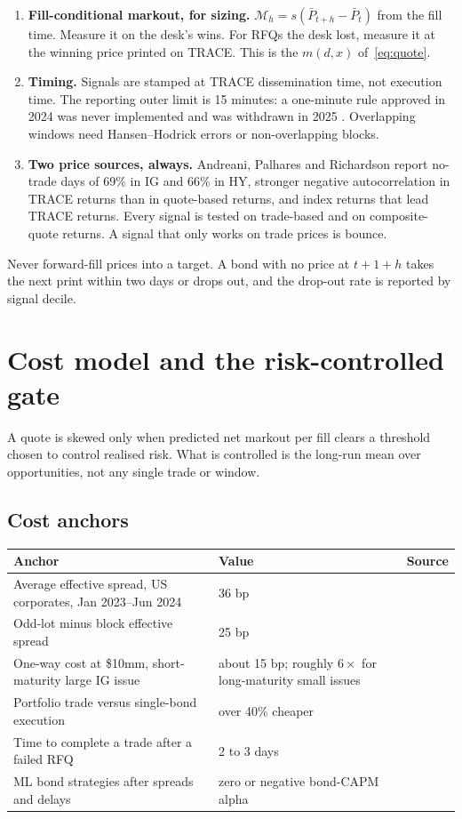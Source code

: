 \documentclass[11pt,letterpaper]{article}
\newcommand{\Pm}{\bar{P}}                 %
\begin{document}
\begin{enumerate}[itemsep=4pt]
\item \textbf{Fill-conditional markout, for sizing.} $\mathcal{M}_h=s(\Pm_{t+h}-\Pm_t)$ from the fill time. Measure it on the desk's wins. For RFQs the desk lost, measure it at the winning price printed on TRACE. This is the $m(d,x)$ of~\eqref{eq:quote}.

\item \textbf{Timing.} Signals are stamped at TRACE dissemination time, not execution time. The reporting outer limit is 15 minutes: a one-minute rule approved in 2024 was never implemented and was withdrawn in 2025 \cite{sec2025}. Overlapping windows need Hansen--Hodrick errors or non-overlapping blocks.

\item \textbf{Two price sources, always.} Andreani, Palhares and Richardson \cite{andreani2024} report no-trade days of 69\% in IG and 66\% in HY, stronger negative autocorrelation in TRACE returns than in quote-based returns, and index returns that lead TRACE returns. Every signal is tested on trade-based and on composite-quote returns. A signal that only works on trade prices is bounce.
\end{enumerate}

Never forward-fill prices into a target. A bond with no price at $t+1+h$ takes the next print within two days or drops out, and the drop-out rate is reported by signal decile.

\section{Cost model and the risk-controlled gate}
\label{sec:cost}

A quote is skewed only when predicted net markout per fill clears a threshold chosen to control realised risk. What is controlled is the long-run mean over opportunities, not any single trade or window.

\subsection{Cost anchors}
\begin{center}
\begin{tabularx}{\textwidth}{@{}X l l@{}}
\toprule
Anchor & Value & Source \\
\midrule
Average effective spread, US corporates, Jan 2023--Jun 2024 & 36 bp & \cite{msrb2025} \\
Odd-lot minus block effective spread & 25 bp & \cite{msrb2025} \\
One-way cost at \$10mm, short-maturity large IG issue & about 15 bp; roughly $6\times$ for long-maturity small issues & \cite{ivakos2024} \\
Portfolio trade versus single-bond execution & over 40\% cheaper & \cite{mt2023} \\
Time to complete a trade after a failed RFQ & 2 to 3 days & \cite{klpw2025} \\
ML bond strategies after spreads and delays & zero or negative bond-CAPM alpha & \cite{dnr2024} \\
\bottomrule
\end{tabularx}
\end{center}
\end{document}
